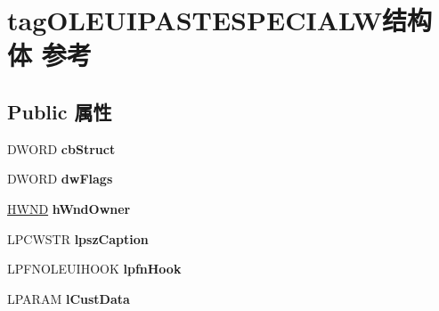 \hypertarget{structtag_o_l_e_u_i_p_a_s_t_e_s_p_e_c_i_a_l_w}{}\section{tag\+O\+L\+E\+U\+I\+P\+A\+S\+T\+E\+S\+P\+E\+C\+I\+A\+L\+W结构体 参考}
\label{structtag_o_l_e_u_i_p_a_s_t_e_s_p_e_c_i_a_l_w}
\subsection*{Public 属性}
\begin{DoxyCompactItemize}
\item 
\mbox{\label{structtag_o_l_e_u_i_p_a_s_t_e_s_p_e_c_i_a_l_w_a733a7cf7528e7fa8ef846e178dfd4a41}} 
D\+W\+O\+RD {\bfseries cb\+Struct}
\item 
\mbox{\label{structtag_o_l_e_u_i_p_a_s_t_e_s_p_e_c_i_a_l_w_a3c9e07c5eca11f1ee96e1c81f20a533a}} 
D\+W\+O\+RD {\bfseries dw\+Flags}
\item 
\mbox{\label{structtag_o_l_e_u_i_p_a_s_t_e_s_p_e_c_i_a_l_w_ae52644f3cddb6755a94e26c1f923eeaf}} 
\hyperlink{interfacevoid}{H\+W\+ND} {\bfseries h\+Wnd\+Owner}
\item 
\mbox{\label{structtag_o_l_e_u_i_p_a_s_t_e_s_p_e_c_i_a_l_w_a8b3fcfdb60082c4c62845a2d3f44f34f}} 
L\+P\+C\+W\+S\+TR {\bfseries lpsz\+Caption}
\item 
\mbox{\label{structtag_o_l_e_u_i_p_a_s_t_e_s_p_e_c_i_a_l_w_aa6223fe8c51d099efdc839084213935a}} 
L\+P\+F\+N\+O\+L\+E\+U\+I\+H\+O\+OK {\bfseries lpfn\+Hook}
\item 
\mbox{\label{structtag_o_l_e_u_i_p_a_s_t_e_s_p_e_c_i_a_l_w_abdcafd6823aeec601a2e5d2839a993e8}} 
L\+P\+A\+R\+AM {\bfseries l\+Cust\+Data}
\item 
\mbox{\label{structtag_o_l_e_u_i_p_a_s_t_e_s_p_e_c_i_a_l_w_a38ff08134f66a337968cb6be3bd738f8}} 

\end{DoxyCompactItemize}
